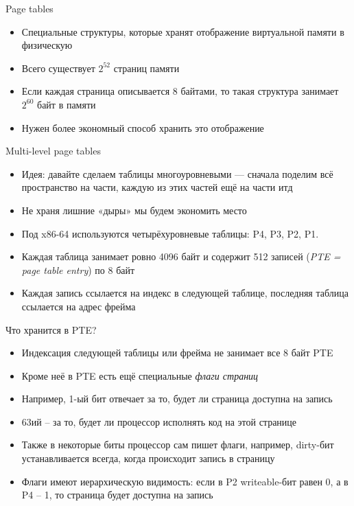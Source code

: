 \documentclass[10pt,pdf,hyperref={unicode}]{beamer}
\begin{document}
\begin{frame}{Page tables}
\begin{itemize}
    \item Специальные структуры, которые хранят отображение виртуальной памяти в физическую
    \item Всего существует $2^{52}$ страниц памяти
    \item Если каждая страница описывается 8 байтами, то такая структура занимает $2^{60}$ байт в памяти
    \item Нужен более экономный способ хранить это отображение
\end{itemize}
\end{frame}

\begin{frame}{Multi-level page tables}
\begin{itemize}
    \item Идея: давайте сделаем таблицы многоуровневыми — сначала поделим всё пространство на части, каждую из этих частей ещё на части итд
    \item Не храня лишние «дыры» мы будем экономить место
     \item Под x86-64 используются четырёхуровневые таблицы: P4, P3, P2, P1.
     \item Каждая таблица занимает ровно 4096 байт и содержит 512 записей (\emph{PTE = page table entry}) по 8 байт
     \item Каждая запись ссылается на индекс в следующей таблице, последняя таблица ссылается на адрес фрейма
\end{itemize}
\end{frame}

\begin{frame}{Что хранится в PTE?}
\begin{itemize}
    \item Индексация следующей таблицы или фрейма не занимает все 8 байт PTE
    \item Кроме неё в PTE есть ещё специальные \emph{флаги страниц}
    \item Например, 1-ый бит отвечает за то, будет ли страница доступна на запись
    \item 63ий -- за то, будет ли процессор исполнять код на этой странице
    \item Также в некоторые биты процессор сам пишет флаги, например, dirty-бит устанавливается всегда, когда происходит запись в страницу
    \item Флаги имеют иерархическую видимость: если в P2 writeable-бит равен 0, а в P4 -- 1, то страница будет доступна на запись
\end{itemize}
\end{frame}
\end{document}

